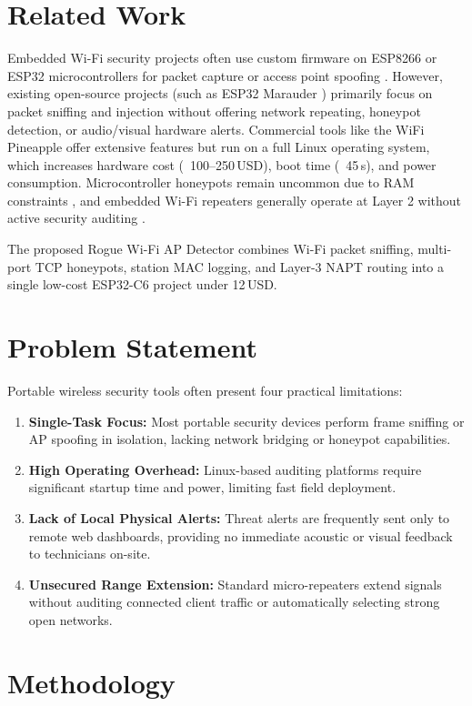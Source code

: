 \documentclass[conference]{IEEEtran}
\begin{document}
\section{Related Work}
Embedded Wi-Fi security projects often use custom firmware on ESP8266 or ESP32 microcontrollers for packet capture or access point spoofing \cite{espressif_idf}. However, existing open-source projects (such as ESP32 Marauder \cite{marauder}) primarily focus on packet sniffing and injection without offering network repeating, honeypot detection, or audio/visual hardware alerts. Commercial tools like the WiFi Pineapple \cite{pineapple} offer extensive features but run on a full Linux operating system, which increases hardware cost (~100--250\,USD), boot time (~45\,s), and power consumption. Microcontroller honeypots remain uncommon due to RAM constraints \cite{honeypot_iot}, and embedded Wi-Fi repeaters generally operate at Layer 2 without active security auditing \cite{napt_ref}.

The proposed Rogue Wi-Fi AP Detector combines Wi-Fi packet sniffing, multi-port TCP honeypots, station MAC logging, and Layer-3 NAPT routing into a single low-cost ESP32-C6 project under 12\,USD.

\section{Problem Statement}
Portable wireless security tools often present four practical limitations:
\begin{enumerate}
    \item \textbf{Single-Task Focus:} Most portable security devices perform frame sniffing or AP spoofing in isolation, lacking network bridging or honeypot capabilities.
    \item \textbf{High Operating Overhead:} Linux-based auditing platforms require significant startup time and power, limiting fast field deployment.
    \item \textbf{Lack of Local Physical Alerts:} Threat alerts are frequently sent only to remote web dashboards, providing no immediate acoustic or visual feedback to technicians on-site.
    \item \textbf{Unsecured Range Extension:} Standard micro-repeaters extend signals without auditing connected client traffic or automatically selecting strong open networks.
\end{enumerate}

\section{Methodology}
\end{document}
